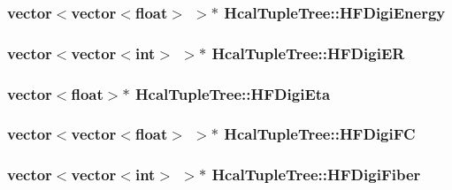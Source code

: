 \subsubsection[{H\+F\+Digi\+Energy}]{\setlength{\rightskip}{0pt plus 5cm}vector$<$vector$<$float$>$ $>$$\ast$ Hcal\+Tuple\+Tree\+::\+H\+F\+Digi\+Energy}\label{class_hcal_tuple_tree_af4208c69d37152cef6fff1c1dd026155}
\hypertarget{class_hcal_tuple_tree_a9a2b7882484368d1d4976f6388d306c7}{}
\subsubsection[{H\+F\+Digi\+E\+R}]{\setlength{\rightskip}{0pt plus 5cm}vector$<$vector$<$int$>$ $>$$\ast$ Hcal\+Tuple\+Tree\+::\+H\+F\+Digi\+E\+R}\label{class_hcal_tuple_tree_a9a2b7882484368d1d4976f6388d306c7}
\hypertarget{class_hcal_tuple_tree_a4ee87b23a35d035afec70d98d6c319aa}{}
\subsubsection[{H\+F\+Digi\+Eta}]{\setlength{\rightskip}{0pt plus 5cm}vector$<$float$>$$\ast$ Hcal\+Tuple\+Tree\+::\+H\+F\+Digi\+Eta}\label{class_hcal_tuple_tree_a4ee87b23a35d035afec70d98d6c319aa}
\hypertarget{class_hcal_tuple_tree_ac47c0113b05b20cdee0a28017cd08724}{}
\subsubsection[{H\+F\+Digi\+F\+C}]{\setlength{\rightskip}{0pt plus 5cm}vector$<$vector$<$float$>$ $>$$\ast$ Hcal\+Tuple\+Tree\+::\+H\+F\+Digi\+F\+C}\label{class_hcal_tuple_tree_ac47c0113b05b20cdee0a28017cd08724}
\hypertarget{class_hcal_tuple_tree_afa91f65c9740c7625235ef9da5adefc3}{}
\subsubsection[{H\+F\+Digi\+Fiber}]{\setlength{\rightskip}{0pt plus 5cm}vector$<$vector$<$int$>$ $>$$\ast$ Hcal\+Tuple\+Tree\+::\+H\+F\+Digi\+Fiber}\label{class_hcal_tuple_tree_afa91f65c9740c7625235ef9da5adefc3}
\hypertarget{class_hcal_tuple_tree_a739afd6b2bb92d5fd58d345333531cc9}{}
